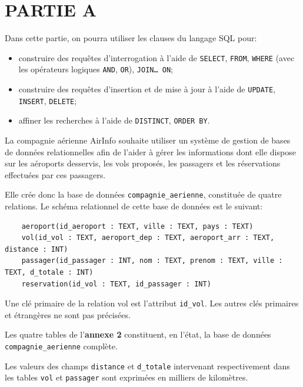 

\medskip


\section*{PARTIE A}

Dans cette partie, on pourra utiliser les clauses du langage SQL pour:

\begin{itemize}
    \item construire des requêtes d'interrogation à l'aide de \texttt{SELECT}, \texttt{FROM}, \texttt{WHERE} (avec les opérateurs logiques \texttt{AND}, \texttt{OR}), \texttt{JOIN\ldots{} ON};
    \item construire des requêtes d'insertion et de mise à jour à l'aide de \texttt{UPDATE}, \texttt{INSERT}, \texttt{DELETE};
    \item affiner les recherches à l'aide de \texttt{DISTINCT}, \texttt{ORDER BY}.
\end{itemize}

La compagnie aérienne AirInfo souhaite utiliser un système de gestion de bases de données relationnelles afin de l'aider à gérer les informations dont elle dispose sur les aéroports desservis, les vols proposés, les passagers et les réservations effectuées par ces passagers.

Elle crée donc la base de données \texttt{compagnie\_aerienne}, constituée de quatre relations. Le schéma relationnel de cette base de données est le suivant:

\begin{verbatim}
    aeroport(id_aeroport : TEXT, ville : TEXT, pays : TEXT)
    vol(id_vol : TEXT, aeroport_dep : TEXT, aeroport_arr : TEXT, distance : INT)
    passager(id_passager : INT, nom : TEXT, prenom : TEXT, ville : TEXT, d_totale : INT)
    reservation(id_vol : TEXT, id_passager : INT)
\end{verbatim}

Une clé primaire de la relation vol est l'attribut \texttt{id\_vol}. Les autres clés primaires et étrangères ne sont pas précisées.

Les quatre tables de l'\textbf{annexe 2} constituent, en l'état, la base de données \texttt{compagnie\_aerienne} complète.

Les valeurs des champs \texttt{distance} et \texttt{d\_totale} intervenant respectivement dans les tables \texttt{vol} et \texttt{passager} sont exprimées en milliers de kilomètres.

